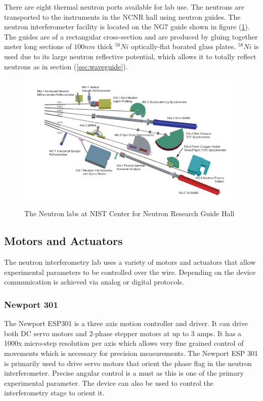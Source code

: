 There are eight thermal neutron ports available for lab use. The neutrons are transported to the instruments in the NCNR hall using neutron guides. The neutron interferometer facility is located on the NG7 guide shown in figure (\ref{fig:guides}). The guides are of a rectangular cross-section and are produced by gluing together meter long sections of $100nm$ thick $^{58}Ni$ optically-flat borated glass plates. $^{58}Ni$ is used due to its large neutron reflective potential, which allows it to totally reflect neutrons as in section (\ref{sec:waveguide}). 
\begin{figure}[ht!]
\centering
\includegraphics[scale=0.5]{Figures/guides.png}
\caption{The Neutron labs at NIST Center for Neutron Research Guide Hall}
\label{fig:guides}
\end{figure}

\subsection{Motors and Actuators}
The neutron interferometry lab uses a variety of motors and actuators that allow experimental parameters to be controlled over the wire. Depending on the device communication is achieved via analog or digital protocols.
\subsubsection{Newport 301}

The Newport ESP301 is a three axis motion controller and driver.\cite{esp301manual} It can drive both DC servo motors and 2-phase stepper motors at up to 3 amps. It has a 1000x micro-step resolution per axis which allows very fine grained control of movements which is necessary for precision measurements. The Newport ESP 301 is primarily used to drive servo motors that orient the phase flag in the neutron interferometer. Precise angular control is a must as this is one of the primary experimental parameter. The device can also be used to control the interferometry stage to orient it. 

